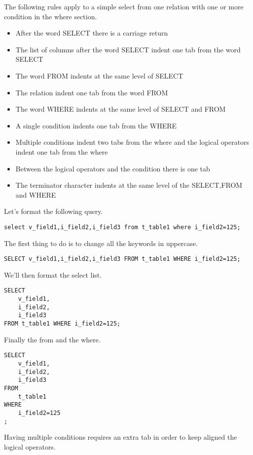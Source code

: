 The following rules apply to a simple select from one relation with one or more condition in the where section.
\begin{itemize}
 \item After the word SELECT there is a carriage return
 \item The list of columns after the word SELECT indent one tab from the word SELECT
 \item The word FROM indents at the same level of SELECT 
 \item The relation indent one tab from the word FROM
 \item The word WHERE indents at the same level of SELECT and FROM
 \item A single condition indents one tab from the WHERE 
 \item Multiple conditions indent two tabs from the where and the logical operators indent one tab from the where
 \item Between the logical operators and the condition there is one tab
 \item The terminator character indents at the same level of the SELECT,FROM and WHERE
\end{itemize}

Let's format the following query.

\begin{lstlisting}[style=pgsql]
 select v_field1,i_field2,i_field3 from t_table1 where i_field2=125;
\end{lstlisting}

The first thing to do is to change all the keywords in uppercase.

\begin{lstlisting}[style=pgsql]
 SELECT v_field1,i_field2,i_field3 FROM t_table1 WHERE i_field2=125;
\end{lstlisting}

We'll then format the select list.

\begin{lstlisting}[style=pgsql]
SELECT 
	v_field1,
	i_field2,
	i_field3 
FROM t_table1 WHERE i_field2=125;
\end{lstlisting}

Finally the from and the where.

\begin{lstlisting}[style=pgsql]
SELECT 
	v_field1,
	i_field2,
	i_field3 
FROM 
	t_table1 
WHERE 
	i_field2=125
;
\end{lstlisting}


Having multiple conditions requires an extra tab in order to keep aligned the logical operators.

